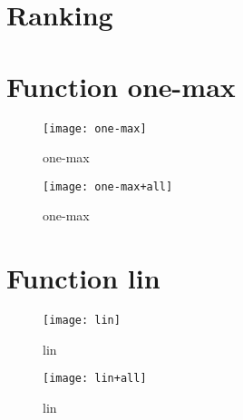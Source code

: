 \graphicspath{{../graphics/}}

\section{Ranking}

\begin{center}

\end{center}


\newpage

\section{Function one-max}

\begin{center}

\end{center}

\begin{figure}[h]
\begin{center}
\texttt{[image: one-max]}
\caption{one-max}
\end{center}
\end{figure}

\begin{figure}[h]
\begin{center}
\texttt{[image: one-max+all]}
\caption{one-max}
\end{center}
\end{figure}

\newpage

\section{Function lin}

\begin{center}

\end{center}

\begin{figure}[h]
\begin{center}
\texttt{[image: lin]}
\caption{lin}
\end{center}
\end{figure}

\begin{figure}[h]
\begin{center}
\texttt{[image: lin+all]}
\caption{lin}
\end{center}
\end{figure}

